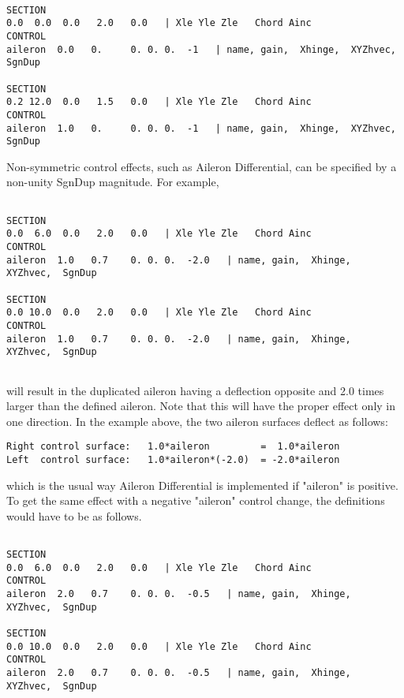 \begin{lstlisting}

SECTION
0.0  0.0  0.0   2.0   0.0   | Xle Yle Zle   Chord Ainc
CONTROL                         
aileron  0.0   0.     0. 0. 0.  -1   | name, gain,  Xhinge,  XYZhvec,  SgnDup

SECTION
0.2 12.0  0.0   1.5   0.0   | Xle Yle Zle   Chord Ainc
CONTROL                         
aileron  1.0   0.     0. 0. 0.  -1   | name, gain,  Xhinge,  XYZhvec,  SgnDup

\end{lstlisting}


Non-symmetric control effects, such as Aileron Differential, can be specified
by a non-unity SgnDup magnitude.  For example, 

\begin{lstlisting}

SECTION
0.0  6.0  0.0   2.0   0.0   | Xle Yle Zle   Chord Ainc
CONTROL                         
aileron  1.0   0.7    0. 0. 0.  -2.0   | name, gain,  Xhinge,  XYZhvec,  SgnDup

SECTION
0.0 10.0  0.0   2.0   0.0   | Xle Yle Zle   Chord Ainc
CONTROL                         
aileron  1.0   0.7    0. 0. 0.  -2.0   | name, gain,  Xhinge,  XYZhvec,  SgnDup


\end{lstlisting}

will result in the duplicated aileron having a deflection opposite and 
2.0 times larger than the defined aileron.  Note that this will have 
the proper effect only in one direction.  In the example above, the 
two aileron surfaces deflect as follows:

\begin{lstlisting}
Right control surface:   1.0*aileron         =  1.0*aileron
Left  control surface:   1.0*aileron*(-2.0)  = -2.0*aileron
\end{lstlisting}

which is the usual way Aileron Differential is implemented if "aileron" 
is positive. To get the same effect with a negative "aileron" control change, 
the definitions would have to be as follows.
\begin{lstlisting}

SECTION
0.0  6.0  0.0   2.0   0.0   | Xle Yle Zle   Chord Ainc
CONTROL                         
aileron  2.0   0.7    0. 0. 0.  -0.5   | name, gain,  Xhinge,  XYZhvec,  SgnDup

SECTION
0.0 10.0  0.0   2.0   0.0   | Xle Yle Zle   Chord Ainc
CONTROL                         
aileron  2.0   0.7    0. 0. 0.  -0.5   | name, gain,  Xhinge,  XYZhvec,  SgnDup

\end{lstlisting}

